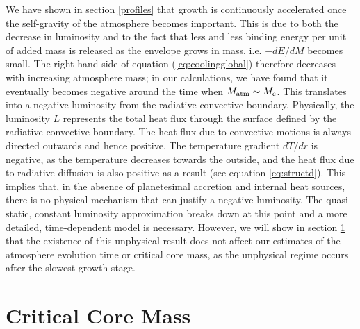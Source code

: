 \documentclass[apj]{emulateapj}
\begin{document}
We have shown in section \ref{profiles} that growth is continuously accelerated once the self-gravity of the atmosphere becomes important. This is due to both the decrease in luminosity and to the fact that less and less binding energy per unit of added mass is released as the envelope grows in mass, i.e. $-dE/dM$ becomes small. The right-hand side of equation (\ref{eq:coolingglobal}) therefore decreases with increasing atmosphere mass; in our calculations, we have found that it eventually becomes negative around the time when $M_{\rm{atm}} \sim M_{\rm{c}}$. This translates into a negative luminosity from the radiative-convective boundary. Physically, the luminosity $L$ represents the total heat flux through the surface defined by the radiative-convective boundary. The heat flux due to convective motions is always directed outwards and hence positive. The temperature gradient $dT/dr$ is negative, as the temperature decreases towards the outside, and the heat flux due to radiative diffusion is also positive as a result (see equation \ref{eq:structd}). This implies that, in the absence of planetesimal accretion and internal heat sources, there is no physical mechanism that can justify a negative luminosity. The quasi-static, constant luminosity approximation breaks down at this point and a more detailed, time-dependent model is necessary. However, we will show in section \ref{critical} that the existence of this unphysical result does not affect our estimates of the atmosphere evolution time or critical core mass, as the unphysical regime occurs after the slowest growth stage. %




\section{Critical Core Mass}
\label{critical}

\end{document}
